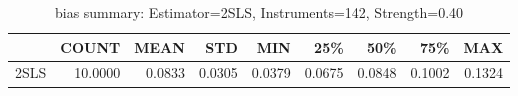 \begin{table}[ht]
\centering
\caption{bias summary: Estimator=2SLS, Instruments=142, Strength=0.40}
\begin{tabular}{lrrrrrrrr}
\toprule
 & COUNT & MEAN & STD & MIN & 25\% & 50\% & 75\% & MAX \\
\midrule
2SLS & 10.0000 & 0.0833 & 0.0305 & 0.0379 & 0.0675 & 0.0848 & 0.1002 & 0.1324 \\
\bottomrule
\end{tabular}
\end{table}
